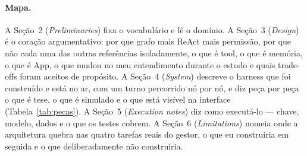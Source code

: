 \documentclass[10pt,twocolumn]{article}
\begin{document}
\paragraph{Mapa.} A Seção~2 (\emph{Preliminaries}) fixa o vocabulário e lê o domínio. A
Seção~3 (\emph{Design}) é o coração argumentativo: por que grafo mais ReAct mais permissão,
por que não cada uma das outras referências isoladamente, o que é tool, o que é memória, o
que é App, o que mudou no meu entendimento durante o estudo e quais trade-offs foram aceitos
de propósito. A Seção~4 (\emph{System}) descreve o harness que foi construído e está no ar,
com um turno percorrido nó por nó, e diz peça por peça o que é tese, o que é simulado e o
que está visível na interface (Tabela~\ref{tab:pecas}). A Seção~5 (\emph{Execution notes})
diz como executá-lo --- chave, modelo, dados e o que os testes cobrem. A Seção~6
(\emph{Limitations}) nomeia onde a arquitetura quebra nas quatro tarefas reais do gestor, o
que eu construiria em seguida e o que deliberadamente não construiria.
\end{document}
